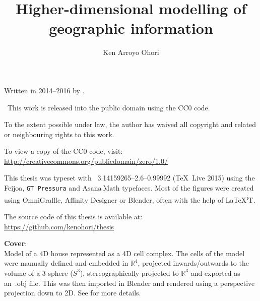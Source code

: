 
% 

\author{Ken Arroyo Ohori}
\title{Higher-dimensional modelling of geographic information}
\date{}
\maketitle

\clearpage
\thispagestyle{empty}
\null%
\label{thesis:colophon}
\vfill
{}
Written in 2014--2016 by
{\makeatletter
\href{http://ken.mx}{\@author}%
\makeatother}.

\cczero\ This work is released into the public domain using the CC0 code.

To the extent possible under law, the author has waived all copyright and related or neighbouring rights to this work.

To view a copy of the CC0 code, visit: \\
\url{http://creativecommons.org/publicdomain/zero/1.0/}

This thesis was typeset with \XeTeX\ 3.14159265--2.6--0.99992 (\TeX\ Live 2015) using the \mbox{{\fanciestfont{}Feijoa}}, \texttt{GT Pressura} and $\mathrm{Asana\ Math}$ typefaces.
Most of the figures were created using OmniGraffle, Affinity Designer or Blender, often with the help of \LaTeX{}\textsuperscript{i}T.

The source code of this thesis is available at: \\
\url{https://github.com/kenohori/thesis}

\textbf{Cover}: \\
Model of a 4D house represented as a 4D cell complex.
The cells of the model were manually defined and embedded in $\mathbb{R}^4$, projected inwards/outwards to the volume of a 3-sphere ($S^3$), stereographically projected to $\mathbb{R}^3$ and exported as an\ {}.obj file.
This was then imported in Blender and rendered using a perspective projection down to 2D.
See  for more details.

